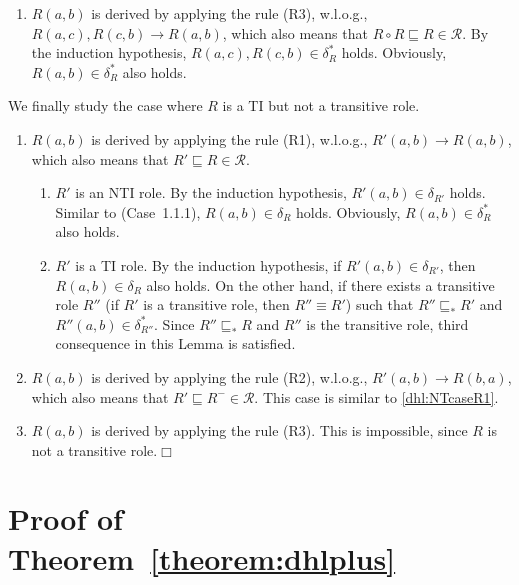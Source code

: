 \documentclass[final,1p,times]{elsarticle}
\begin{document}
\begin{enumerate}[leftmargin=12ex,label=Case~2.\arabic*, ref=Case~2.\arabic*]
\item $R(a,b)$ is derived by applying the rule (R3), w.l.o.g., $R(a,c),R(c,b)\rightarrow R(a,b)$,
    which also means that $R\circ R\sqsubseteq R\in\mathcal{R}$. By the induction hypothesis,
    $R(a,c),R(c,b)\in\delta_{R}^*$ holds. Obviously, $R(a,b)\in\delta_{R}^*$ also holds.
\end{enumerate}

We finally study the case where $R$ is a TI but not a transitive role.

\begin{enumerate}[leftmargin=12ex,label=Case~3.\arabic*, ref=Case~3.\arabic*]
\item $R(a,b)$ is derived by applying the rule (R1), w.l.o.g., $R'(a,b)\rightarrow R(a,b)$,
    which also means that $R'\sqsubseteq R\in\mathcal{R}$.\label{dhl:NTcaseR1}
    \begin{enumerate}[leftmargin=8ex,label=Case~3.1.\arabic*]
    \item $R'$ is an NTI role. By the induction hypothesis, $R'(a,b)\in\delta_{R'}$ holds.
        Similar to (Case~1.1.1), $R(a,b)\in\delta_{R}$ holds.
        Obviously, $R(a,b)\in\delta_{R}^*$ also holds.

    \item $R'$ is a TI role. By the induction hypothesis, if $R'(a,b)\in\delta_{R'}$,
        then $R(a,b)\in\delta_R$ also holds. On the other hand, if there exists a transitive role
        $R''$ (if $R'$ is a transitive role, then $R''\equiv R'$) such that
        $R''\sqsubseteq_* R'$ and $R''(a,b)\in\delta_{R''}^*$. Since $R''\sqsubseteq_* R$ and
        $R''$ is the transitive role, third consequence in this Lemma is satisfied.
    \end{enumerate}

\item $R(a,b)$ is derived by applying the rule (R2), w.l.o.g., $R'(a,b)\rightarrow R(b,a)$,
    which also means that $R'\sqsubseteq R^-\in\mathcal{R}$. This case is similar to \ref{dhl:NTcaseR1}.

\item $R(a,b)$ is derived by applying the rule (R3). This is impossible, since $R$ is not a transitive
    role.\hfill$\Box$
\end{enumerate}


\section{Proof of Theorem~\ref{theorem:dhlplus}}
\end{document}
